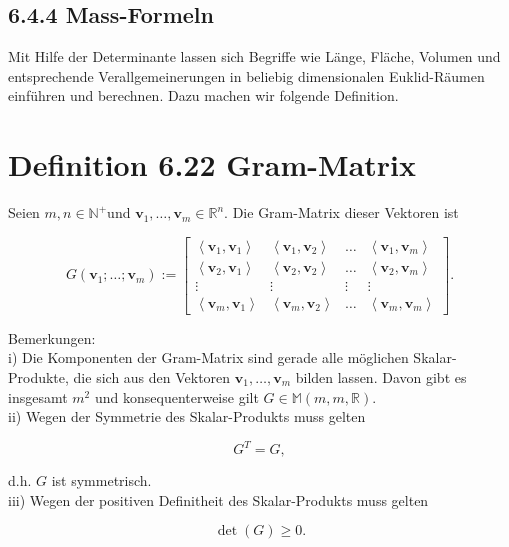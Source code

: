 \documentclass[10pt]{article}
\begin{document}
\subsection*{6.4.4 Mass-Formeln}
Mit Hilfe der Determinante lassen sich Begriffe wie Länge, Fläche, Volumen und entsprechende Verallgemeinerungen in beliebig dimensionalen Euklid-Räumen einführen und berechnen. Dazu machen wir folgende Definition.

\section*{Definition 6.22 Gram-Matrix}
Seien $m, n \in \mathbb{N}^{+}$und $\mathbf{v}_{1}, \ldots, \mathbf{v}_{m} \in \mathbb{R}^{n}$. Die Gram-Matrix dieser Vektoren ist

\[
G\left(\mathbf{v}_{1} ; \ldots ; \mathbf{v}_{m}\right):=\left[\begin{array}{cccc}
\left\langle\mathbf{v}_{1}, \mathbf{v}_{1}\right\rangle & \left\langle\mathbf{v}_{1}, \mathbf{v}_{2}\right\rangle & \ldots & \left\langle\mathbf{v}_{1}, \mathbf{v}_{m}\right\rangle  \tag{6.134}\\
\left\langle\mathbf{v}_{2}, \mathbf{v}_{1}\right\rangle & \left\langle\mathbf{v}_{2}, \mathbf{v}_{2}\right\rangle & \ldots & \left\langle\mathbf{v}_{2}, \mathbf{v}_{m}\right\rangle \\
\vdots & \vdots & \vdots & \vdots \\
\left\langle\mathbf{v}_{m}, \mathbf{v}_{1}\right\rangle & \left\langle\mathbf{v}_{m}, \mathbf{v}_{2}\right\rangle & \ldots & \left\langle\mathbf{v}_{m}, \mathbf{v}_{m}\right\rangle
\end{array}\right] .
\]

Bemerkungen:\\
i) Die Komponenten der Gram-Matrix sind gerade alle möglichen Skalar-Produkte, die sich aus den Vektoren $\mathbf{v}_{1}, \ldots, \mathbf{v}_{m}$ bilden lassen. Davon gibt es insgesamt $m^{2}$ und konsequenterweise gilt $G \in \mathbb{M}(m, m, \mathbb{R})$.\\
ii) Wegen der Symmetrie des Skalar-Produkts muss gelten


\begin{equation*}
G^{T}=G, \tag{6.135}
\end{equation*}


d.h. $G$ ist symmetrisch.\\
iii) Wegen der positiven Definitheit des Skalar-Produkts muss gelten


\begin{equation*}
\operatorname{det}(G) \geq 0 . \tag{6.136}
\end{equation*}
\end{document}
